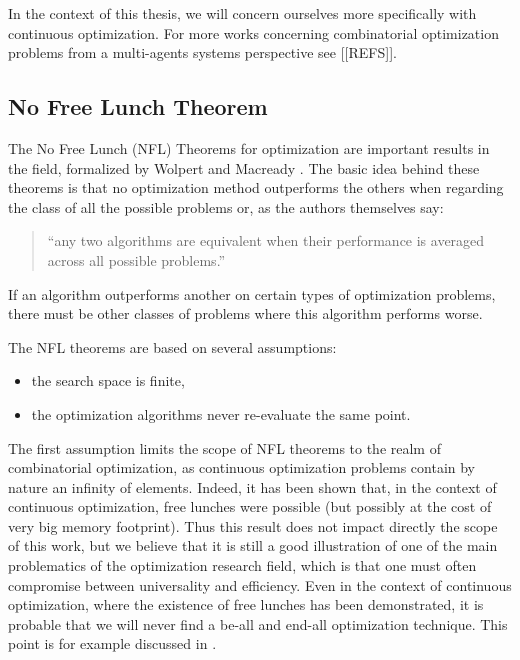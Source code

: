 In the context of this thesis, we will concern ourselves more specifically with continuous optimization. For more works concerning combinatorial optimization problems from a multi-agents systems perspective see [[REFS]].

\subsection{No Free Lunch Theorem}

The No Free Lunch (NFL) Theorems for optimization are important results in the field, formalized by Wolpert and Macready \cite{585893}. The basic idea behind these theorems is that no optimization method outperforms the others when regarding the class of all the possible problems or, as the authors themselves say:
\begin{quote}
\enquote{any two algorithms are equivalent when their performance is averaged across all possible problems.}
\end{quote}
If an algorithm outperforms another on certain types of optimization problems, there must be other classes of problems where this algorithm performs worse.

The NFL theorems are based on several assumptions:
\begin{itemize}

\item the search space is finite,

\item the optimization algorithms never re-evaluate the same point.

\end{itemize}

The first assumption limits the scope of NFL theorems to the realm of combinatorial optimization, as continuous optimization problems contain by nature an infinity of elements. Indeed, it has been shown that, in the context of continuous optimization, free lunches were possible \cite{Auger-s00453-008-9244-5} (but possibly at the cost of very big memory footprint). Thus this result does not impact directly the scope of this work, but we believe that it is still a good illustration of one of the main problematics of the optimization research field, which is that one must often compromise between universality and efficiency. Even in the context of continuous optimization, where the existence of free lunches has been demonstrated, it is probable that we will never find a be-all and end-all optimization technique. This point is for example discussed in \cite{Doe05}.

